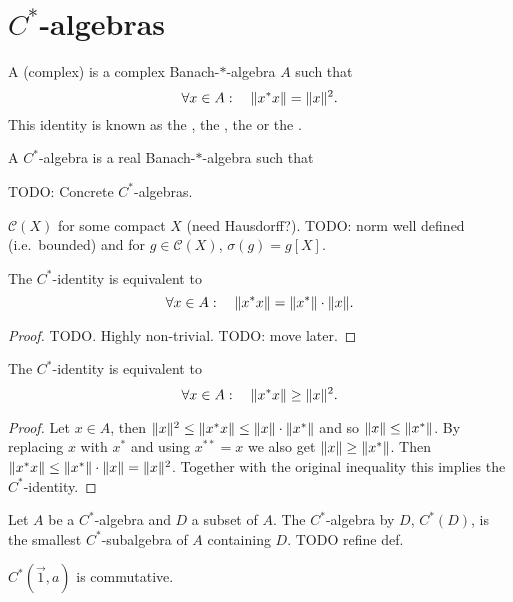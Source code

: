 \section{$C^*$-algebras}
\begin{definition}
A (complex)  is a complex Banach-$*$-algebra $A$ such that
\[\forall x\in A: \quad \lVert x^*x\rVert = \lVert x\rVert^2.\]
This identity is known as the , the , the  or the .
\end{definition}

\begin{definition}
A  $C^*$-algebra is a real Banach-$*$-algebra such that 
\end{definition}

\begin{example}
TODO: Concrete $C^*$-algebras.

$\mathcal{C}(X)$ for some compact $X$ (need Hausdorff?). TODO: norm well defined (i.e.\ bounded) and for $g\in \mathcal{C}(X)$, $\sigma(g) = g[X]$.
\end{example}

\begin{proposition}
The $C^*$-identity is equivalent to
\[\forall x\in A: \quad \lVert x^*x\rVert = \lVert x^*\rVert\cdot\lVert x\rVert.\]
\end{proposition}
\begin{proof}
TODO. Highly non-trivial. TODO: move later.
\end{proof}


\begin{lemma} \label{C*identityEquivalent}
The $C^*$-identity is equivalent to
\[\forall x\in A: \quad \lVert x^*x\rVert \geq \lVert x\rVert^2.\]
\end{lemma}
\begin{proof}
Let $x\in A$, then $\lVert x\rVert^2 \leq \lVert x^*x\rVert \leq \lVert x\rVert\cdot\lVert x^*\rVert$ and so $\lVert x\rVert\leq \lVert x^*\rVert$. By replacing $x$ with $x^*$ and using $x^{**}=x$ we also get $\lVert x\rVert\geq \lVert x^*\rVert$. Then $\lVert x^*x\rVert\leq \lVert x^*\rVert\cdot\lVert x\rVert = \lVert x\rVert^2$. Together with the original inequality this implies the $C^*$-identity.
\end{proof}

\begin{definition}
Let $A$ be a $C^*$-algebra and $D$ a subset of $A$. The $C^*$-algebra  by $D$, $C^*(D)$, is the smallest $C^*$-subalgebra of $A$ containing $D$.
TODO refine def.
\end{definition}
\begin{lemma}
$C^*(\vec{1},a)$ is commutative.
\end{lemma}

